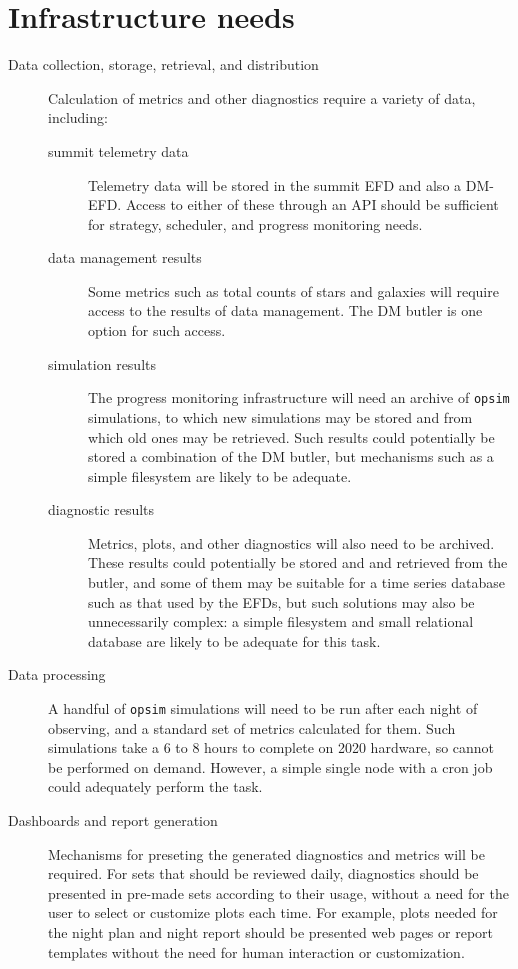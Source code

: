 \section{Infrastructure needs}
\label{sec:orge9fd5b7}
\begin{description}
\item[{Data collection, storage, retrieval, and distribution}] Calculation of metrics and other diagnostics require a variety of data, including:
\begin{description}
\item[{summit telemetry data}] Telemetry data will be stored in the summit EFD and also a DM-EFD. Access to either of these through an API should be sufficient for strategy, scheduler, and progress monitoring needs.
\item[{data management results}] Some metrics such as total counts of stars and galaxies will require access to the results of data management. The DM butler is one option for such access.
\item[{simulation results}] The progress monitoring infrastructure will need an archive of \texttt{opsim} simulations, to which new simulations may be stored and from which old ones may be retrieved. Such results could potentially be stored a combination of the DM butler, but mechanisms such as a simple filesystem are likely to be adequate.
\item[{diagnostic results}] Metrics, plots, and other diagnostics will also need to be archived. These results could potentially be stored and and retrieved from the butler, and some of them may be suitable for a time series database such as that used by the EFDs, but such solutions may also be unnecessarily complex: a simple filesystem and small relational database are likely to be adequate for this task.
\end{description}
\item[{Data processing}] A handful of \texttt{opsim} simulations will need to be run after each night of observing, and a standard set of metrics calculated for them. Such simulations take a 6 to 8 hours to complete on 2020 hardware, so cannot be performed on demand. However, a simple single node with a cron job could adequately perform the task.
\item[{Dashboards and report generation}] Mechanisms for preseting the generated diagnostics and metrics will be required. For sets that should be reviewed daily, diagnostics  should be presented in pre-made sets according to their usage, without a need for the user to select or customize plots each time. For example, plots needed for the night plan and night report should be presented web pages or report templates without the need for human interaction or customization.
\end{description}


